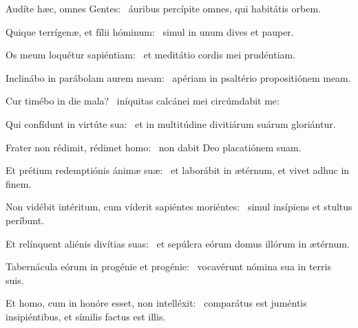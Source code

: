 \item Audíte hæc, omnes Gentes:~\psstar{} áuribus percípite omnes, qui habitátis orbem.

\item Quique terrígenæ, et fílii hóminum:~\psstar{} simul in unum dives et pauper.

\item Os meum loquétur sapiéntiam:~\psstar{} et meditátio cordis mei prudéntiam.

\item Inclinábo in parábolam aurem meam:~\psstar{} apériam in psaltério propositiónem meam.

\item Cur timébo in die mala?~\psstar{} iníquitas calcánei mei circúmdabit me:

\item Qui confídunt in virtúte sua:~\psstar{} et in multitúdine divitiárum suárum gloriántur.

\item Frater non rédimit, rédimet homo:~\psstar{} non dabit Deo placatiónem suam.

\item Et prétium redemptiónis ánimæ suæ:~\psstar{} et laborábit in ætérnum, et vivet adhuc in finem.

\item Non vidébit intéritum, cum víderit sapiéntes moriéntes:~\psstar{} simul insípiens et stultus períbunt.

\item Et relínquent aliénis divítias suas:~\psstar{} et sepúlcra eórum domus illórum in ætérnum.

\item Tabernácula eórum in progénie et progénie:~\psstar{} vocavérunt nómina sua in terris suis.

\item Et homo, cum in honóre esset, non intelléxit:~\psstar{} comparátus est juméntis insipiéntibus, et símilis factus est illis.

